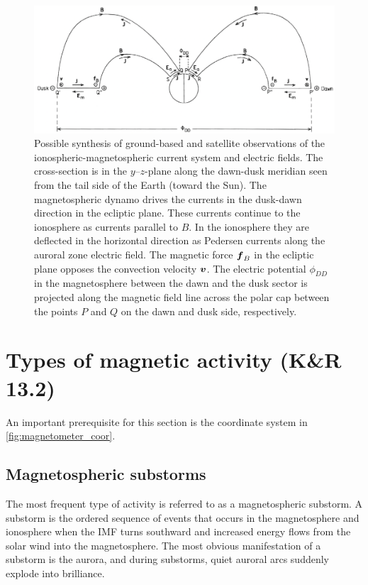 \begin{figure}[t]
    \centering
    \includegraphics[width=.9\linewidth]{bilder/L13_polar_cap_currents.png}
    \caption{Possible synthesis of ground-based and satellite observations of the ionospheric-magnetospheric current system and electric fields. The cross-section is in the \(y\)--\(z\)-plane along the dawn-dusk meridian seen from the tail side of the Earth (toward the Sun). The magnetospheric dynamo drives the currents in the dusk-dawn direction in the ecliptic plane. These currents continue to the ionosphere as currents parallel to \(B\). In the ionosphere they are deflected in the horizontal direction as Pedersen currents along the auroral zone electric field. The magnetic force \(\boldsymbol{f}_B\) in the ecliptic plane opposes the convection velocity \(\boldsymbol{v}\). The electric potential \(\phi_{DD}\) in the magnetosphere between the dawn and the dusk sector is projected along the magnetic field line across the polar cap between the points \(P\) and \(Q\) on the dawn and dusk side, respectively.}\label{fig:L13_polar_cap_currents}
\end{figure}

\section[Types of magnetic activity]{Types of magnetic activity (K\&R 13.2)}
An important prerequisite for this section is the coordinate system in \cref{fig:magnetometer_coor}.
\subsection{Magnetospheric substorms}
The most frequent type of activity is referred to as a magnetospheric substorm. A substorm is the ordered sequence of events that occurs in the magnetosphere and ionosphere when the IMF turns southward and increased energy flows from the solar wind into the magnetosphere. The most obvious manifestation of a substorm is the aurora, and during substorms, quiet auroral arcs suddenly explode into brilliance.

